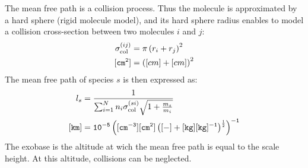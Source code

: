 The mean free path is a collision process. Thus the molecule is approximated
by a hard sphere (rigid molecule model), and its hard sphere radius enables
to model a collision cross-section between two molecules $i$ and $j$:
\begin{equation}
\begin{split}
\sigma^{(ij)}_\text{col} & = \pi\left(r_i + r_j\right)^2 \\
\tt [cm^2]               & = \left([cm] + [cm]\right)^2
\end{split}
\label{sigma_collision}
\end{equation}
The mean free path of species $s$ is then expressed as:
\begin{equation}
\begin{split}
l_s   &     = \frac{1}{\sum_{i=1}^{N}n_i\sigma^{(si)}_\text{col}\sqrt{1 + \frac{m_s}{m_i}}} \\
\tt [km] & \tt = 10^{-5}\left([cm^{-3}] [cm^2] \left([-] + [kg][kg]^{-1}\right)^{\frac{1}{2}}\right)^{-1}
\end{split}
\label{mean_free_path}
\end{equation}
The exobase is the altitude at wich the mean free path is equal to the scale height. At this
altitude, collisions can be neglected.
